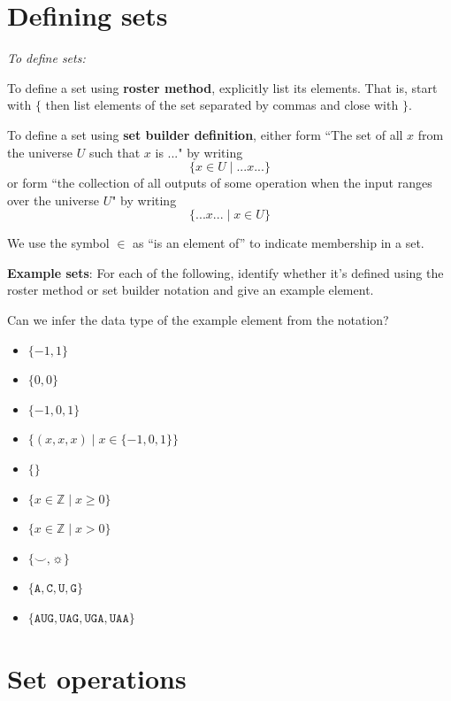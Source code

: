 \documentclass[12pt, oneside]{article}
\newcommand{\A}[0]{\texttt{A}}
\newcommand{\C}[0]{\texttt{C}}
\newcommand{\G}[0]{\texttt{G}}
\newcommand{\U}[0]{\texttt{U}}
\begin{document}
\section*{Defining sets}


{\it To define sets:}

To define a set using {\bf roster method}, explicitly list its elements. That is,
start with $\{$ then list elements of 
the set separated by commas and close with $\}$.

\vfill

To define a set using {\bf set builder definition}, either form 
``The set of all $x$ from the universe $U$ such that $x$ is ..." by writing
\[\{x \in U \mid ...x... \}\]
or form ``the collection of all outputs of some operation when the input ranges over the universe $U$"
by writing
\[\{ ...x... \mid x\in U \}\]

\vfill

We use the symbol $\in$ as ``is an element of'' to indicate membership in a set.\\

\newpage 

{\bf Example sets}: For each of the following, identify whether it's defined using the roster method
or set builder notation and give an example element.

Can we infer the data type of the example element from the notation?

\begin{itemize}
    \item[]$\{ -1, 1\}$
    \vfill
    \item[]$\{0, 0 \}$
    \vfill
    \item[]$\{-1, 0, 1 \}$
    \vfill
    \item[]$\{(x,x,x) \mid x \in \{-1,0,1\} \}$
    \vfill
    \item[]$\{ \}$
    \vfill
    \item[]$\{ x \in \mathbb{Z} \mid x \geq 0 \}$
    \vfill
    \item[]$\{ x \in \mathbb{Z}  \mid x > 0 \}$
    \vfill
    \item[]$\{ \smile, \sun \}$
    \vfill
    \item[]$\{\A,\C,\U,\G\}$
    \vfill
    \item[]$\{\A\U\G, \U\A\G, \U\G\A, \U\A\A \}$
    \vfill
\end{itemize}
 \vfill
\section*{Set operations}
\end{document}
